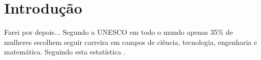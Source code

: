 \chapter{Introdução}
\label{cap:intro}
Farei por depois... 
Segundo a UNESCO em todo o mundo apenas 35$\%$ de mulheres escolhem seguir carreira em campos de ciência, tecnologia, engenharia e matemática. Seguindo esta estatística \cite{UNESCO2018}.
\cite{Misa2010}


